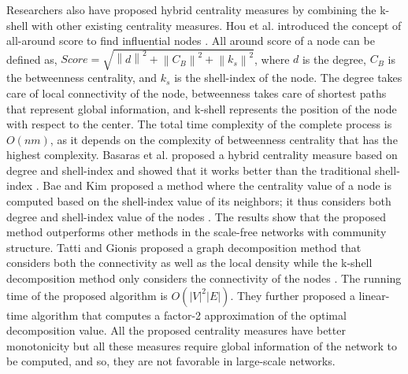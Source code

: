 \documentclass[12pt,3p]{article}
\begin{document}
Researchers also have proposed hybrid centrality measures by combining the k-shell with other existing centrality measures. Hou et al. introduced the concept of all-around score to find influential nodes \cite{hou2012identifying}. All around score of a node can be defined as, $Score=\sqrt{\left \| d \right \|^2 + \left \| C_B \right \| ^2 +\left \| k_s \right \|^2 }$, where $d$ is the degree, $C_B$ is the betweenness centrality, and $k_s$ is the shell-index of the node. The degree takes care of local connectivity of the node, betweenness takes care of shortest paths that represent global information, and k-shell represents the position of the node with respect to the center. The total time complexity of the complete process is $O(nm)$, as it depends on the complexity of betweenness centrality that has the highest complexity. Basaras et al. proposed a hybrid centrality measure based on degree and shell-index and showed that it works better than the traditional shell-index \cite{basaras2013detecting}. Bae and Kim proposed a method where the centrality value of a node is computed based on the shell-index value of its neighbors; it thus considers both degree and shell-index value of the nodes \cite{bae2014identifying}. The results show that the proposed method outperforms other methods in the scale-free networks with community structure. Tatti and Gionis proposed a graph decomposition method that considers both the connectivity as well as the local density while the k-shell decomposition method only considers the connectivity of the nodes \cite{tatti2015density}. The running time of the proposed algorithm is $O(|V|^2|E|)$. They further proposed a linear-time algorithm that computes a factor-2 approximation of the optimal decomposition value. All the proposed centrality measures have better monotonicity but all these measures require global information of the network to be computed, and so, they are not favorable in large-scale networks.


\end{document}
